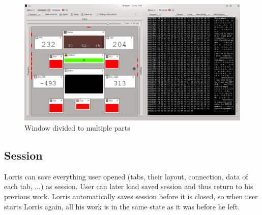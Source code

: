 \documentclass[12pt, a4paper, oneside]{article}
\begin{document}
\begin{figure}[H]
\begin{center}
\includegraphics[width=\textwidth]{img/split.png}
\caption{Window divided to multiple parts}
\label{split_img}
\end{center}
\end{figure}

\enlargethispage{60mm} %
\setlength{\voffset}{-20mm}
\addtolength{\textheight}{20mm}
\newpage
\subsection{Session}
Lorris can save everything user opened (tabs, their layout, connection, data of each tab, ...) as session. User can later load saved session and thus return to his previous work. Lorris automatically saves session before it is closed, so when user starts Lorris again, all his work is in the same state as it was before he left.
\end{document}
